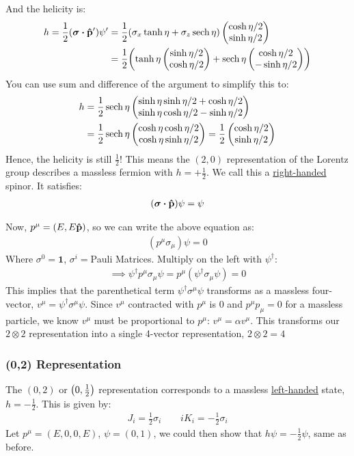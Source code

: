 And the helicity is:
\begin{align*}
  h=\frac12(\bm{\sigma}\vdot\vu{p}')\psi'&=\frac12
  \qty(\sigma_x\tanh\eta+\sigma_z\sech\eta)\pmqty{\cosh\eta/2\\\sinh\eta/2}\\
  &=\frac12\qty(\tanh\eta\pmqty{\sinh\eta/2\\\cosh\eta/2}
  +\sech\eta\pmqty{\cosh\eta/2\\-\sinh\eta/2})
\end{align*}
You can use sum and difference of the argument to simplify this to:
\begin{align*}
  h&=\frac12\sech\eta\pmqty{
    \sinh\eta\sinh\eta/2+\cosh\eta/2\\
    \sinh\eta\cosh\eta/2-\sinh\eta/2
  }\\
  &=\frac12\sech\eta\pmqty{
    \cosh\eta\cosh\eta/2\\
    \cosh\eta\sinh\eta/2
  }
  =\frac12\pmqty{
    \cosh\eta/2\\
    \sinh\eta/2
  }
\end{align*}
Hence, the helicity is still $\frac12$! This means the $(2,0)$ representation of the Lorentz group describes a massless fermion with $h=+\frac12$. We call this a \underline{right-handed} spinor. It satisfies:
\begin{align*}
  (\bm{\sigma}\vdot\vu{p})\psi=\psi
\end{align*}

Now, $p^\mu=(E,E\vu{p})$, so we can write the above equation as:
\begin{align*}
  (p^\mu\sigma_\mu)\psi=0
\end{align*}
Where $\sigma^0=\bm{1}$, $\sigma^i=$Pauli Matrices. Multiply on the left with $\psi^\dag$:
\begin{align*}
  \implies\psi^\dag p^\mu\sigma_\mu\psi=p^\mu(\psi^\dag\sigma_\mu\psi)=0
\end{align*}
This implies that the parenthetical term $\psi^\dag\sigma^\mu\psi$ transforms as a massless four-vector, $v^\mu=\psi^\dag\sigma^\mu\psi$. Since $v^\mu$ contracted with $p^\mu$ is 0 and $p^\mu p_\mu=0$ for a massless particle, we know $v^\mu$ must be proportional to $p^\mu$: $v^\mu=\alpha v^\mu$. This transforms our $2\otimes2$ representation into a single 4-vector representation, $2\otimes2=4$

\subsubsection{(0,2) Representation}
The $(0,2)$ or $\qty(0,\frac12)$ representation corresponds to a massless \underline{left-handed} state, $h=-\frac12$. This is given by:
\begin{align*}
  J_i=\frac12\sigma_i\qquad iK_i=-\frac12\sigma_i
\end{align*}
Let $p^\mu=(E,0,0,E)$, $\psi=(0,1)$, we could then show that $h\psi=-\frac12\psi$, same as before.

